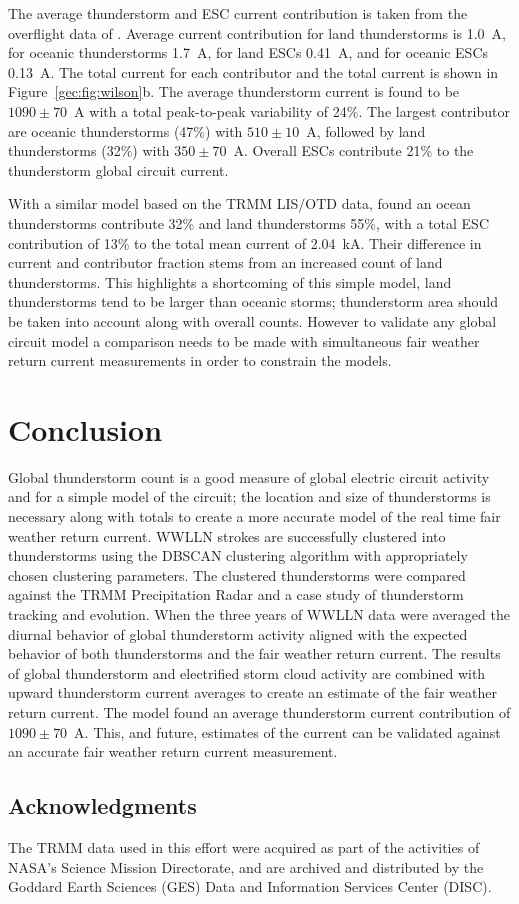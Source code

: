 The average thunderstorm and ESC current contribution is taken from the overflight data of \citet{Mach2010}.
Average current contribution for land thunderstorms is 1.0~A, for oceanic thunderstorms 1.7~A, for land ESCs 0.41~A, and for oceanic ESCs 0.13~A.
The total current for each contributor and the total current is shown in Figure~\ref{gec:fig:wilson}b.
The average thunderstorm current is found to be $1090 \pm 70$~A with a total peak-to-peak variability of 24\%.
The largest contributor are oceanic thunderstorms (47\%) with $510 \pm 10$~A, followed by land thunderstorms (32\%) with $350 \pm 70$~A.
Overall ESCs contribute 21\% to the thunderstorm global circuit current.

With a similar model based on the TRMM LIS/OTD data, \citet{Mach2011} found an ocean thunderstorms contribute 32\% and land thunderstorms 55\%, with a total ESC contribution of 13\% to the total mean current of 2.04~kA.
Their difference in current and contributor fraction stems from an increased count of land thunderstorms.
This highlights a shortcoming of this simple model, land thunderstorms tend to be larger than oceanic storms; thunderstorm area should be taken into account along with overall counts.
However to validate any global circuit model a comparison needs to be made with simultaneous fair weather return current measurements in order to constrain the models.

\section{Conclusion}


Global thunderstorm count is a good measure of global electric circuit activity and for a simple model of the circuit; the location and size of thunderstorms is necessary along with totals to create a more accurate model of the real time fair weather return current.
WWLLN strokes are successfully clustered into thunderstorms using the DBSCAN clustering algorithm with appropriately chosen clustering parameters.
The clustered thunderstorms were compared against the TRMM Precipitation Radar and a case study of thunderstorm tracking and evolution.
When the three years of WWLLN data were averaged the diurnal behavior of global thunderstorm activity aligned with the expected behavior of both thunderstorms and the fair weather return current.
The results of global thunderstorm and electrified storm cloud activity are combined with upward thunderstorm current averages to create an estimate of the fair weather return current.
The model found an average thunderstorm current contribution of $1090 \pm 70$~A.
This, and future, estimates of the current can be validated against an accurate fair weather return current measurement.

\subsection*{Acknowledgments}
The TRMM data used in this effort were acquired as part of the activities of NASA's Science Mission Directorate, and are archived and distributed by the Goddard Earth Sciences (GES) Data and Information Services Center (DISC).
